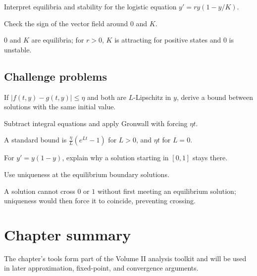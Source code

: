 \begin{exercise}\label{exr:ii19-expand-14}
Interpret equilibria and stability for the logistic equation \(y'=ry(1-y/K)\).
\end{exercise}
\begin{hint}
Check the sign of the vector field around \(0\) and \(K\).
\end{hint}
\begin{solution}
\(0\) and \(K\) are equilibria; for \(r>0\), \(K\) is attracting for positive states and \(0\) is unstable.
\end{solution}

\subsection*{Challenge problems}

\begin{exercise}\label{exr:ii19-expand-15}
If \(|f(t,y)-g(t,y)|\le\eta\) and both are \(L\)-Lipschitz in \(y\), derive a bound between solutions with the same initial value.
\end{exercise}
\begin{hint}
Subtract integral equations and apply Gronwall with forcing \(\eta t\).
\end{hint}
\begin{solution}
A standard bound is \(\frac{\eta}{L}(e^{Lt}-1)\) for \(L>0\), and \(\eta t\) for \(L=0\).
\end{solution}

\begin{exercise}\label{exr:ii19-expand-16}
For \(y'=y(1-y)\), explain why a solution starting in \([0,1]\) stays there.
\end{exercise}
\begin{hint}
Use uniqueness at the equilibrium boundary solutions.
\end{hint}
\begin{solution}
A solution cannot cross \(0\) or \(1\) without first meeting an equilibrium solution; uniqueness would then force it to coincide, preventing crossing.
\end{solution}
\section*{Chapter summary}
The chapter's tools form part of the Volume II analysis toolkit and will be used in later approximation, fixed-point, and convergence arguments.
